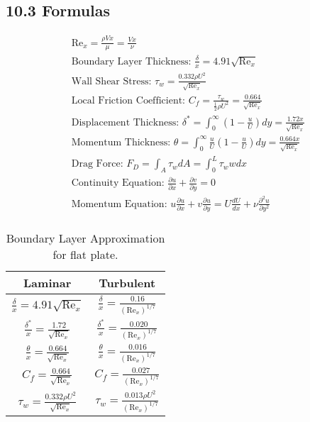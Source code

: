\subsection*{10.3 Formulas}
\begin{fleqn}
    \begin{align*}
        &\text{Re}_x = \frac{\rho V x}{\mu}  = \frac{V x}{\nu} \\
        &\text{Boundary Layer Thickness: } \frac{\delta}{x} = 4.91 \sqrt{\text{Re}_x} \\
        &\text{Wall Shear Stress: } \tau_w = \frac{0.332 \rho U^2}{\sqrt{\text{Re}_x}} \\
        &\text{Local Friction Coefficient: } C_f = \frac{\tau_w}{\frac{1}{2} \rho U^2} = \frac{0.664}{\sqrt{\text{Re}_x}} \\
        &\text{Displacement Thickness: } \delta^* = \int_0^\infty \left(1 - \frac{u}{U}\right) dy = \frac{1.72 x}{\sqrt{\text{Re}_x}} \\
        &\text{Momentum Thickness: } \theta = \int_0^\infty \frac{u}{U} \left(1 - \frac{u}{U}\right) dy = \frac{0.664 x}{\sqrt{\text{Re}_x}} \\   
        &\text{Drag Force: } F_D = \int_A \tau_w dA = \int_0^L \tau_w w dx \\
        &\text{Continuity Equation: } \frac{\partial u}{\partial x} + \frac{\partial v}{\partial y} = 0 \\
        &\text{Momentum Equation: } u \frac{\partial u}{\partial x} + v \frac{\partial u}{\partial y} = U \frac{dU}{dx} + \nu \frac{\partial^2 u}{\partial y^2} \\
    \end{align*}
\end{fleqn}

\begin{table}[H]
    \caption{Boundary Layer Approximation for flat plate.}
    \label{tab:boundary_layer_approximation}
    \centering
    \begin{tabular}{cc}
        \hline
        Laminar & Turbulent \\
        \hline
        $\frac{\delta}{x} = 4.91 \sqrt{\text{Re}_x}$ & $\frac{\delta}{x} = \frac{0.16}{(\text{Re}_x)^{1/7}}$ \\
        $\frac{\delta^*}{x} = \frac{1.72}{\sqrt{\text{Re}_x}}$ & $\frac{\delta^*}{x} = \frac{0.020}{(\text{Re}_x)^{1/7}}$ \\
        $\frac{\theta}{x} = \frac{0.664}{\sqrt{\text{Re}_x}}$ & $\frac{\theta}{x} = \frac{0.016}{(\text{Re}_x)^{1/7}}$ \\   
        $C_f = \frac{0.664}{\sqrt{\text{Re}_x}}$ & $C_f = \frac{0.027}{(\text{Re}_x)^{1/7}}$ \\
        $\tau_w = \frac{0.332 \rho U^2}{\sqrt{\text{Re}_x}}$ & $\tau_w = \frac{0.013 \rho U^2}{(\text{Re}_x)^{1/7}}$ \\
        \hline
    \end{tabular}
\end{table}